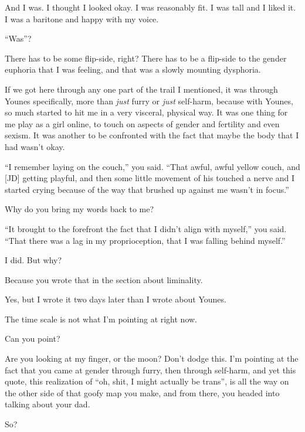 And I was. I thought I looked okay. I was reasonably fit. I was tall and I liked it. I was a baritone and happy with my voice.

\begin{ally}
``Was''?
\end{ally}
There has to be some flip-side, right? There has to be a flip-side to the gender euphoria that I was feeling, and that was a slowly mounting dysphoria.

If we got here through any one part of the trail I mentioned, it was through Younes specifically, more than \emph{just} furry or \emph{just} self-harm, because with Younes, so much started to hit me in a very visceral, physical way. It was one thing for me play as a girl online, to touch on aspects of gender and fertility and even sexism. It was another to be confronted with the fact that maybe the body that I had wasn't okay.

\begin{ally}
``I remember laying on the couch,'' you said. ``That awful, awful yellow couch, and {[}JD{]} getting playful, and then some little movement of his touched a nerve and I started crying because of the way that brushed up against me wasn't in focus.''
\end{ally}
Why do you bring my words back to me?

\begin{ally}
``It brought to the forefront the fact that I didn't align with myself,'' you said. ``That there was a lag in my proprioception, that I was falling behind myself.''
\end{ally}
I did. But why?

\begin{ally}
Because you wrote that in the section about liminality.
\end{ally}
Yes, but I wrote it two days later than I wrote about Younes.

\begin{ally}
The time scale is not what I'm pointing at right now.
\end{ally}
Can you point?

\begin{ally}
Are you looking at my finger, or the moon? Don't dodge this. I'm pointing at the fact that you came at gender through furry, then through self-harm, and yet this quote, this realization of ``oh, shit, I might actually be trans'', is all the way on the other side of that goofy map you make, and from there, you headed into talking about your dad.
\end{ally}
So?

